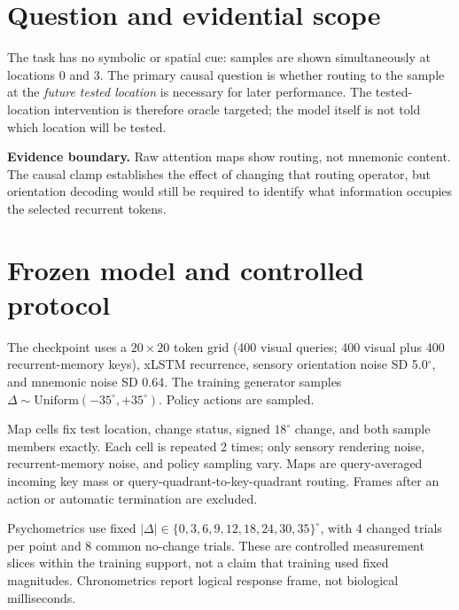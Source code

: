 \documentclass[10pt]{article}
\newcommand{\boundary}[1]{\par\smallskip\colorbox{Light}{\parbox{0.96\linewidth}{\textbf{Evidence boundary.} #1}}\par\smallskip}
\begin{document}
\section{Question and evidential scope}
The task has no symbolic or spatial cue: samples are shown simultaneously at locations 0 and 3. The primary causal question is whether routing to the sample at the \emph{future tested location} is necessary for later performance. The tested-location intervention is therefore oracle targeted; the model itself is not told which location will be tested.

\boundary{Raw attention maps show routing, not mnemonic content. The causal clamp establishes the effect of changing that routing operator, but orientation decoding would still be required to identify what information occupies the selected recurrent tokens.}

\section{Frozen model and controlled protocol}
The checkpoint uses a $20\times20$ token grid (400 visual queries; 400 visual plus 400 recurrent-memory keys), xLSTM recurrence, sensory orientation noise SD 5.0$^\circ$, and mnemonic noise SD 0.64. The training generator samples $\Delta\sim\mathrm{Uniform}(-35^\circ,+35^\circ)$. Policy actions are sampled.

Map cells fix test location, change status, signed $18^\circ$ change, and both sample members exactly. Each cell is repeated 2 times; only sensory rendering noise, recurrent-memory noise, and policy sampling vary. Maps are query-averaged incoming key mass or query-quadrant-to-key-quadrant routing. Frames after an action or automatic termination are excluded.

Psychometrics use fixed $|\Delta|\in\{0, 3, 6, 9, 12, 18, 24, 30, 35\}^\circ$, with 4 changed trials per point and 8 common no-change trials. These are controlled measurement slices within the training support, not a claim that training used fixed magnitudes. Chronometrics report logical response frame, not biological milliseconds.
\end{document}
